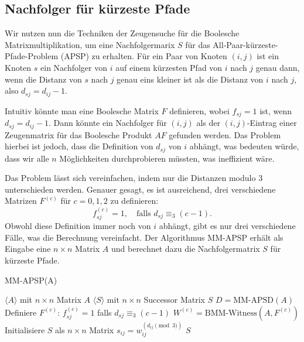\documentclass{scrartcl}
\numberwithin{equation}{section}
\begin{document}
\subsection{Nachfolger für kürzeste Pfade}

Wir nutzen nun die Techniken der Zeugensuche für die Boolesche Matrixmultiplikation, um eine Nachfolgermarix $S$ für das All-Paar-kürzeste-Pfade-Problem (APSP) zu erhalten. Für ein Paar von Knoten $(i, j)$ ist ein Knoten $s$ ein Nachfolger von $i$ auf einem kürzesten Pfad von $i$ nach $j$ genau dann, wenn die Distanz von $s$ nach $j$ genau eins kleiner ist als die Distanz von $i$ nach $j$, also $d_{sj} = d_{ij}-1$.

Intuitiv könnte man eine Boolesche Matrix $F$ definieren, wobei $f_{sj}=1$ ist, wenn $d_{sj}=d_{ij}-1$. Dann könnte ein Nachfolger für $(i, j)$ als der $(i, j)$-Eintrag einer Zeugenmatrix für das Boolesche Produkt $AF$ gefunden werden. Das Problem hierbei ist jedoch, dass die Definition von $d_{sj}$ von $i$ abhängt, was bedeuten würde, dass wir alle $n$ Möglichkeiten durchprobieren müssten, was ineffizient wäre.

Das Problem lässt sich vereinfachen, indem nur die Distanzen modulo 3 unterschieden werden. Genauer gesagt, es ist ausreichend, drei verschiedene Matrizen $F^{(c)}$ für $c=0, 1, 2$ zu definieren:
$$f_{sj}^{(c)}=1, \quad \text{falls } d_{sj} \equiv_3 (c-1).$$
Obwohl diese Definition immer noch von $i$ abhängt, gibt es nur drei verschiedene Fälle, was die Berechnung vereinfacht. Der Algorithmus MM-APSP erhält als Eingabe eine $n \times n$ Matrix $A$ und berechnet dazu die Nachfolgermatrix $S$ für kürzeste Pfade.
\begin{algorithm}
	\caption{MM-APSP(A)}
	\begin{algorithmic}[1]
		\Require $\langle A \rangle$ mit $n \times n$ Matrix $A$
		\Ensure $\langle S \rangle$ mit $n \times n$ Successor Matrix $S$
		\State $D = \text{MM-APSD}(A)$ 
		\State Definiere $F^{(c)}$: $f_{sj}^{(c)}=1$ falls $d_{sj} \equiv_3 (c-1)$
		\State $W^{(c)} = \text{BMM-Witness}(A, F^{(c)})$ 
		\EndFor
		\State Initialisiere $S$ als $n \times n$ Matrix
		\State $s_{ij} = w_{ij}^{(d_{ij} \pmod 3)}$ 
		\EndFor
		\State \Return $S$
	\end{algorithmic}
\end{algorithm}
\end{document}
